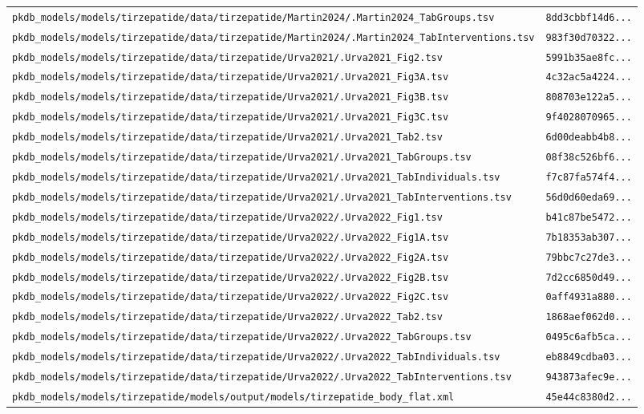 \begin{longtable}{ll}
\texttt{pkdb\_models/models/tirzepatide/data/tirzepatide/Martin2024/.Martin2024\_TabGroups.tsv} & \texttt{8dd3cbbf14d6...} \\
\texttt{pkdb\_models/models/tirzepatide/data/tirzepatide/Martin2024/.Martin2024\_TabInterventions.tsv} & \texttt{983f30d70322...} \\
\texttt{pkdb\_models/models/tirzepatide/data/tirzepatide/Urva2021/.Urva2021\_Fig2.tsv} & \texttt{5991b35ae8fc...} \\
\texttt{pkdb\_models/models/tirzepatide/data/tirzepatide/Urva2021/.Urva2021\_Fig3A.tsv} & \texttt{4c32ac5a4224...} \\
\texttt{pkdb\_models/models/tirzepatide/data/tirzepatide/Urva2021/.Urva2021\_Fig3B.tsv} & \texttt{808703e122a5...} \\
\texttt{pkdb\_models/models/tirzepatide/data/tirzepatide/Urva2021/.Urva2021\_Fig3C.tsv} & \texttt{9f4028070965...} \\
\texttt{pkdb\_models/models/tirzepatide/data/tirzepatide/Urva2021/.Urva2021\_Tab2.tsv} & \texttt{6d00deabb4b8...} \\
\texttt{pkdb\_models/models/tirzepatide/data/tirzepatide/Urva2021/.Urva2021\_TabGroups.tsv} & \texttt{08f38c526bf6...} \\
\texttt{pkdb\_models/models/tirzepatide/data/tirzepatide/Urva2021/.Urva2021\_TabIndividuals.tsv} & \texttt{f7c87fa574f4...} \\
\texttt{pkdb\_models/models/tirzepatide/data/tirzepatide/Urva2021/.Urva2021\_TabInterventions.tsv} & \texttt{56d0d60eda69...} \\
\texttt{pkdb\_models/models/tirzepatide/data/tirzepatide/Urva2022/.Urva2022\_Fig1.tsv} & \texttt{b41c87be5472...} \\
\texttt{pkdb\_models/models/tirzepatide/data/tirzepatide/Urva2022/.Urva2022\_Fig1A.tsv} & \texttt{7b18353ab307...} \\
\texttt{pkdb\_models/models/tirzepatide/data/tirzepatide/Urva2022/.Urva2022\_Fig2A.tsv} & \texttt{79bbc7c27de3...} \\
\texttt{pkdb\_models/models/tirzepatide/data/tirzepatide/Urva2022/.Urva2022\_Fig2B.tsv} & \texttt{7d2cc6850d49...} \\
\texttt{pkdb\_models/models/tirzepatide/data/tirzepatide/Urva2022/.Urva2022\_Fig2C.tsv} & \texttt{0aff4931a880...} \\
\texttt{pkdb\_models/models/tirzepatide/data/tirzepatide/Urva2022/.Urva2022\_Tab2.tsv} & \texttt{1868aef062d0...} \\
\texttt{pkdb\_models/models/tirzepatide/data/tirzepatide/Urva2022/.Urva2022\_TabGroups.tsv} & \texttt{0495c6afb5ca...} \\
\texttt{pkdb\_models/models/tirzepatide/data/tirzepatide/Urva2022/.Urva2022\_TabIndividuals.tsv} & \texttt{eb8849cdba03...} \\
\texttt{pkdb\_models/models/tirzepatide/data/tirzepatide/Urva2022/.Urva2022\_TabInterventions.tsv} & \texttt{943873afec9e...} \\
\texttt{pkdb\_models/models/tirzepatide/models/output/models/tirzepatide\_body\_flat.xml} & \texttt{45e44c8380d2...} \\
\end{longtable}

